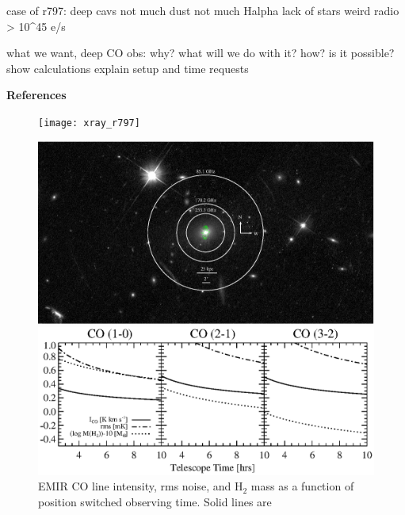 \documentclass[11pt]{article}
\begin{document}
case of r797:
  deep cavs
  not much dust
  not much Halpha
  lack of stars
  weird radio
  > 10^45 e/s

what we want, deep CO obs:
  why?
  what will we do with it?
  how?
  is it possible?
  show calculations
  explain setup and time requests

{\bf{References}}

\begin{figure}[htp]
  \begin{center}
    \begin{minipage}{0.485\linewidth}    
      \texttt{[image: xray\_r797]}
    \end{minipage}
    \begin{minipage}{0.505\linewidth}
      \includegraphics*[width=\textwidth, trim=60mm 17mm 60mm 15mm, clip]{beam_r797}
    \end{minipage}
    \caption{}
    \label{fig:r797}
    \begin{minipage}{\linewidth}
      \includegraphics*[width=\textwidth, trim=28mm 10mm 8mm 50mm, clip]{r797_iram_mh2.eps}
    \end{minipage}
    \caption{EMIR CO line intensity, rms noise, and H$_2$ mass as a
      function of position switched observing time. Solid lines are
}
\end{center}
\end{figure}
\end{document}
